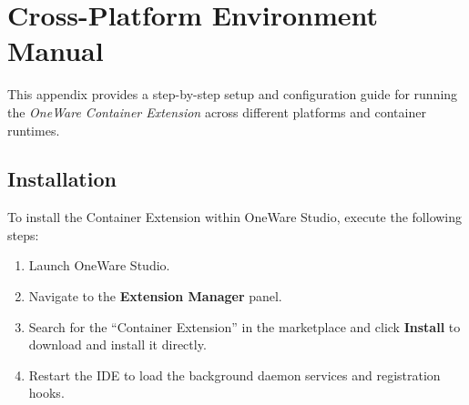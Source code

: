 % 
% 
% 

\chapter{Cross-Platform Environment Manual}
\label{app:manual}

This appendix provides a step-by-step setup and configuration guide for running the \textit{OneWare Container Extension} across different platforms and container runtimes.

\section{Installation}
To install the Container Extension within OneWare Studio, execute the following steps:
\begin{enumerate}
    \item Launch OneWare Studio.
    \item Navigate to the \textbf{Extension Manager} panel.
    \item Search for the ``Container Extension'' in the marketplace and click \textbf{Install} to download and install it directly.
    \item Restart the IDE to load the background daemon services and registration hooks.
\end{enumerate}

